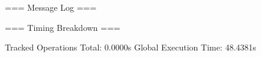 === Message Log ===

=== Timing Breakdown ===

Tracked Operations Total: 0.0000s
Global Execution Time: 48.4381s
